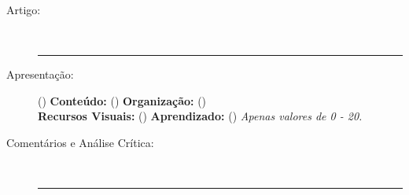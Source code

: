 \documentclass{UnBExam}%
\begin{document}
%
	\begin{description}
		\item[Artigo:] \hrulefill\\\hrule\vspace{1em}%
		\item[\hspace{1.45em}Apresentação:] (\hspace{2.5em}) \hfill%
			\textbf{Conteúdo:} (\hspace{2.5em}) \hfill%
			\textbf{Organização:} (\hspace{2.5em})\\%
			\hspace*{-2.5em}\textbf{Recursos Visuais:} (\hspace{2.5em}) \hspace{4.1em}%
			\textbf{Aprendizado:} (\hspace{2.5em})
			\hfill \emph{Apenas valores de 0 - 20.}\vspace{1em}%
			\item[Comentários e Análise Crítica:] \hrulefill\\\hrule
	\end{description}

    \noindent
    \null\hrulefill\\\null\hrulefill\\\null\hrulefill\\
    \null\hrulefill\\\null\hrulefill\\\null\hrulefill\\
    \null\hrulefill\\\null\hrulefill\\\null\hrulefill\\
    \null\hrulefill\\\null\hrulefill\\\null\hrulefill\\
    \null\hrulefill\\\null\hrulefill\\\null\hrulefill\\
    \null\hrulefill\\\null\hrulefill\\\null\hrulefill\\
    \null\hrulefill\\\null\hrulefill\\\null\hrulefill\\
    \null\hrulefill\\\null\hrulefill\\\null\hrulefill\\
    \null\hrulefill\\\null\hrulefill\\\null\hrulefill\\
    \null\hrulefill\\\null\hrulefill\\\null\hrulefill\\
    \null\hrulefill\\\null\hrulefill\\\null\hrulefill
    \newpage%
\end{document}
